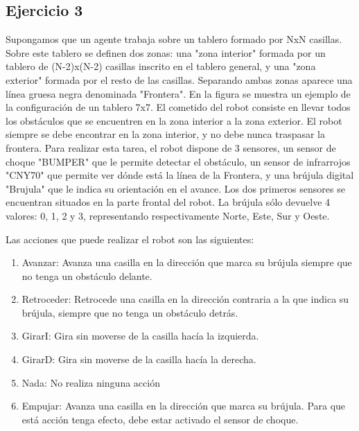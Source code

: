 \subsection*{Ejercicio 3}

Supongamos  que  un  agente  trabaja  sobre  un  tablero  formado  por  NxN  casillas.  Sobre  este 
tablero se definen dos zonas: una "zona interior" formada por un tablero de (N-2)x(N-2) casillas 
inscrito  en  el  tablero  general,  y  una  "zona  exterior"  formada  por  el  resto  de  las  casillas. Separando ambas zonas aparece una línea gruesa negra denominada "Frontera". En la figura se 
muestra un ejemplo de la configuración de un tablero 7x7. 
El  cometido  del  robot  consiste  en  llevar  todos  los  obstáculos  que  se  encuentren  en  la  zona 
interior a la zona exterior. El robot siempre se debe encontrar en la 
zona interior, y no debe nunca traspasar la frontera. 
Para  realizar  esta  tarea,  el  robot  dispone  de  3  sensores,  un  sensor 
de  choque  "BUMPER"  que  le  permite  detectar  el  obstáculo,  un 
sensor de infrarrojos "CNY70" que permite ver dónde está la línea 
de  la  Frontera,  y  una  brújula  digital  "Brujula"  que  le  indica  su 
orientación en el avance. Los dos primeros sensores se encuentran 
situados  en  la  parte  frontal  del  robot.  La  brújula  sólo  devuelve  4 
valores: 0, 1, 2 y 3, representando respectivamente Norte, Este, Sur 
y Oeste. 
 
Las acciones que puede realizar el robot son las siguientes: 
\begin{enumerate}
    \item Avanzar: Avanza una casilla en la dirección que marca su brújula siempre que no tenga 
    un obstáculo delante. 
    \item Retroceder:  Retrocede  una  casilla  en  la  dirección  contraria  a  la  que  indica  su  brújula, 
    siempre que no tenga un obstáculo detrás. 
    \item GirarI: Gira sin moverse de la casilla hacía la izquierda. 
    \item GirarD: Gira sin moverse de la casilla hacía la derecha. 
    \item Nada: No realiza ninguna acción 
    \item Empujar: Avanza una casilla en la dirección que marca su brújula. Para que está acción 
    tenga efecto, debe estar activado el sensor de choque. 
\end{enumerate}

